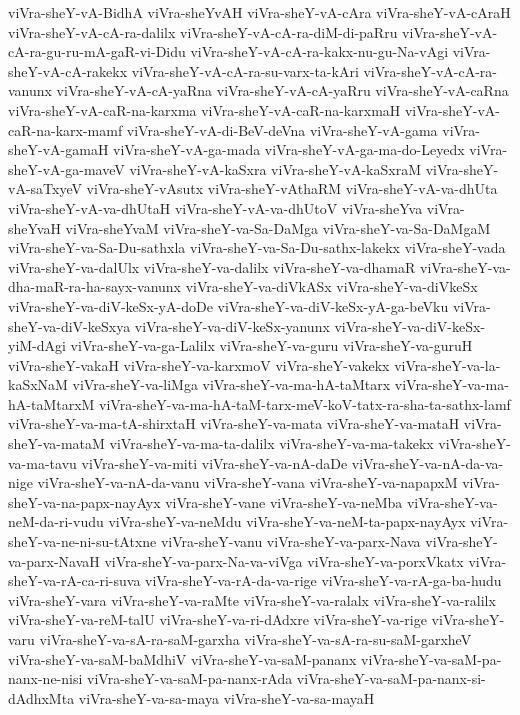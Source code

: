 {viVra-sheY-vA-BidhA
viVra-sheYvAH
viVra-sheY-vA-cAra
viVra-sheY-vA-cAraH
viVra-sheY-vA-cA-ra-dalilx
viVra-sheY-vA-cA-ra-diM-di-paRru
viVra-sheY-vA-cA-ra-gu-ru-mA-gaR-vi-Didu
viVra-sheY-vA-cA-ra-kakx-nu-gu-Na-vAgi
viVra-sheY-vA-cA-rakekx
viVra-sheY-vA-cA-ra-su-varx-ta-kAri
viVra-sheY-vA-cA-ra-vanunx
viVra-sheY-vA-cA-yaRna
viVra-sheY-vA-cA-yaRru
viVra-sheY-vA-caRna
viVra-sheY-vA-caR-na-karxma
viVra-sheY-vA-caR-na-karxmaH
viVra-sheY-vA-caR-na-karx-mamf
viVra-sheY-vA-di-BeV-deVna
viVra-sheY-vA-gama
viVra-sheY-vA-gamaH
viVra-sheY-vA-ga-mada
viVra-sheY-vA-ga-ma-do-Leyedx
viVra-sheY-vA-ga-maveV
viVra-sheY-vA-kaSxra
viVra-sheY-vA-kaSxraM
viVra-sheY-vA-saTxyeV
viVra-sheY-vAsutx
viVra-sheY-vAthaRM
viVra-sheY-vA-va-dhUta
viVra-sheY-vA-va-dhUtaH
viVra-sheY-vA-va-dhUtoV
viVra-sheYva
viVra-sheYvaH
viVra-sheYvaM
viVra-sheY-va-Sa-DaMga
viVra-sheY-va-Sa-DaMgaM
viVra-sheY-va-Sa-Du-sathxla
viVra-sheY-va-Sa-Du-sathx-lakekx
viVra-sheY-vada
viVra-sheY-va-dalUlx
viVra-sheY-va-dalilx
viVra-sheY-va-dhamaR
viVra-sheY-va-dha-maR-ra-ha-sayx-vanunx
viVra-sheY-va-diVkASx
viVra-sheY-va-diVkeSx
viVra-sheY-va-diV-keSx-yA-doDe
viVra-sheY-va-diV-keSx-yA-ga-beVku
viVra-sheY-va-diV-keSxya
viVra-sheY-va-diV-keSx-yanunx
viVra-sheY-va-diV-keSx-yiM-dAgi
viVra-sheY-va-ga-Lalilx
viVra-sheY-va-guru
viVra-sheY-va-guruH
viVra-sheY-vakaH
viVra-sheY-va-karxmoV
viVra-sheY-vakekx
viVra-sheY-va-la-kaSxNaM
viVra-sheY-va-liMga
viVra-sheY-va-ma-hA-taMtarx
viVra-sheY-va-ma-hA-taMtarxM
viVra-sheY-va-ma-hA-taM-tarx-meV-koV-tatx-ra-sha-ta-sathx-lamf
viVra-sheY-va-ma-tA-shirxtaH
viVra-sheY-va-mata
viVra-sheY-va-mataH
viVra-sheY-va-mataM
viVra-sheY-va-ma-ta-dalilx
viVra-sheY-va-ma-takekx
viVra-sheY-va-ma-tavu
viVra-sheY-va-miti
viVra-sheY-va-nA-daDe
viVra-sheY-va-nA-da-va-nige
viVra-sheY-va-nA-da-vanu
viVra-sheY-vana
viVra-sheY-va-napapxM
viVra-sheY-va-na-papx-nayAyx
viVra-sheY-vane
viVra-sheY-va-neMba
viVra-sheY-va-neM-da-ri-vudu
viVra-sheY-va-neMdu
viVra-sheY-va-neM-ta-papx-nayAyx
viVra-sheY-va-ne-ni-su-tAtxne
viVra-sheY-vanu
viVra-sheY-va-parx-Nava
viVra-sheY-va-parx-NavaH
viVra-sheY-va-parx-Na-va-viVga
viVra-sheY-va-porxVkatx
viVra-sheY-va-rA-ca-ri-suva
viVra-sheY-va-rA-da-va-rige
viVra-sheY-va-rA-ga-ba-hudu
viVra-sheY-vara
viVra-sheY-va-raMte
viVra-sheY-va-ralalx
viVra-sheY-va-ralilx
viVra-sheY-va-reM-talU
viVra-sheY-va-ri-dAdxre
viVra-sheY-va-rige
viVra-sheY-varu
viVra-sheY-va-sA-ra-saM-garxha
viVra-sheY-va-sA-ra-su-saM-garxheV
viVra-sheY-va-saM-baMdhiV
viVra-sheY-va-saM-pananx
viVra-sheY-va-saM-pa-nanx-ne-nisi
viVra-sheY-va-saM-pa-nanx-rAda
viVra-sheY-va-saM-pa-nanx-si-dAdhxMta
viVra-sheY-va-sa-maya
viVra-sheY-va-sa-mayaH
}
